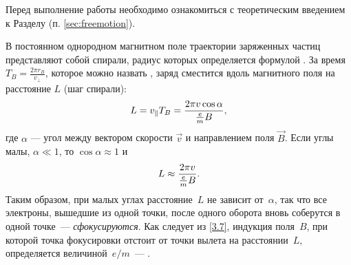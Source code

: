 


Перед выполнение работы необходимо ознакомиться с теоретическим введением
к Разделу (п. \ref{sec:freemotion}).


В постоянном однородном магнитном поле траектории заряженных частиц представляют
собой спирали, радиус которых определяется формулой .
За время $T_B= \frac{2\pi r_B}{v_{\perp}}$, которое можно назвать
\mbox{}, заряд сместится вдоль магнитного поля на 
расстояние $L$ (шаг спирали):
\begin{equation}
    \eqmark{3.6}
    L = v_{\parallel}T_B =\frac{2\pi v\cos\alpha}{\frac{e}{m}B},
\end{equation}
где $\alpha$ --- угол между вектором скорости $\vec{v}$ и направлением поля $\vec{B}$.
Если углы малы, $\alpha \ll 1$, то $\cos\alpha \approx 1$ и
\begin{equation}
    \eqmark{3.7}
    L \approx \frac{2\pi v}{\frac{e}{m}B}.
\end{equation}
Таким образом, при малых углах расстояние~$L$ не зависит от~$\alpha$, так
что все электроны, вышедшие из одной точки, после одного оборота вновь соберутся
в одной точке~--- \emph{сфокусируются}. Как следует из \eqref{3.7}, 
индукция поля~$B$, при которой точка фокусировки отстоит от точки вылета 
на расстоянии~$L$, определяется величиной~$e/m$~--- 
.

%

